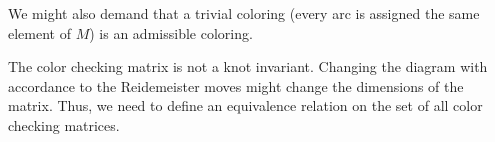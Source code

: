 %
%
%
%
%
%
%



We might also demand that a trivial coloring (every arc is assigned the same element of $M$) is an admissible coloring.

The color checking matrix is not a knot invariant. Changing the diagram with accordance to the Reidemeister moves might change the dimensions of the matrix. Thus, we need to define an equivalence relation on the set of all color checking matrices.

